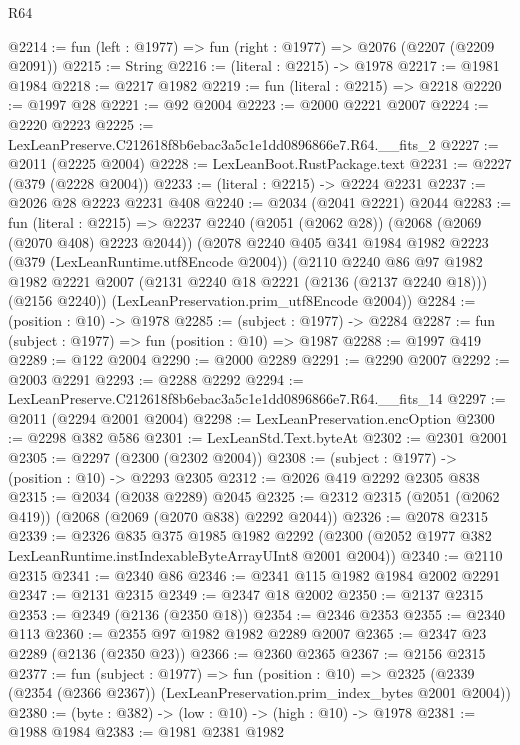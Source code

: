 \begin{lexlean}{R64}
\begin{coremodule}
@2214 := fun (left : @1977) => fun (right : @1977) => @2076 (@2207 (@2209 @2091))
@2215 := String
@2216 := (literal : @2215) -> @1978
@2217 := @1981 @1984
@2218 := @2217 @1982
@2219 := fun (literal : @2215) => @2218
@2220 := @1997 @28
@2221 := @92 @2004
@2223 := @2000 @2221 @2007
@2224 := @2220 @2223
@2225 := LexLeanPreserve.C212618f8b6ebac3a5c1e1dd0896866e7.R64.__fits_2
@2227 := @2011 (@2225 @2004)
@2228 := LexLeanBoot.RustPackage.text
@2231 := @2227 (@379 (@2228 @2004))
@2233 := (literal : @2215) -> @2224 @2231
@2237 := @2026 @28 @2223 @2231 @408
@2240 := @2034 (@2041 @2221) @2044
@2283 := fun (literal : @2215) =>
  @2237
    @2240
    (@2051 (@2062 @28))
    (@2068 (@2069 (@2070 @408) @2223 @2044))
    (@2078
      @2240
      @405
      @341
      @1984
      @1982
      @2223
      (@379 (LexLeanRuntime.utf8Encode @2004))
      (@2110
        @2240
        @86
        @97
        @1982
        @1982
        @2221
        @2007
        (@2131 @2240 @18 @2221 (@2136 (@2137 @2240 @18)))
        (@2156 @2240))
      (LexLeanPreservation.prim_utf8Encode @2004))
@2284 := (position : @10) -> @1978
@2285 := (subject : @1977) -> @2284
@2287 := fun (subject : @1977) => fun (position : @10) => @1987
@2288 := @1997 @419
@2289 := @122 @2004
@2290 := @2000 @2289
@2291 := @2290 @2007
@2292 := @2003 @2291
@2293 := @2288 @2292
@2294 := LexLeanPreserve.C212618f8b6ebac3a5c1e1dd0896866e7.R64.__fits_14
@2297 := @2011 (@2294 @2001 @2004)
@2298 := LexLeanPreservation.encOption
@2300 := @2298 @382 @586
@2301 := LexLeanStd.Text.byteAt
@2302 := @2301 @2001
@2305 := @2297 (@2300 (@2302 @2004))
@2308 := (subject : @1977) -> (position : @10) -> @2293 @2305
@2312 := @2026 @419 @2292 @2305 @838
@2315 := @2034 (@2038 @2289) @2045
@2325 := @2312 @2315 (@2051 (@2062 @419)) (@2068 (@2069 (@2070 @838) @2292 @2044))
@2326 := @2078 @2315
@2339 := @2326
    @835
    @375
    @1985
    @1982
    @2292
    (@2300 (@2052 @1977 @382 LexLeanRuntime.instIndexableByteArrayUInt8 @2001 @2004))
@2340 := @2110 @2315
@2341 := @2340 @86
@2346 := @2341 @115 @1982 @1984 @2002 @2291
@2347 := @2131 @2315
@2349 := @2347 @18 @2002
@2350 := @2137 @2315
@2353 := @2349 (@2136 (@2350 @18))
@2354 := @2346 @2353
@2355 := @2340 @113
@2360 := @2355 @97 @1982 @1982 @2289 @2007
@2365 := @2347 @23 @2289 (@2136 (@2350 @23))
@2366 := @2360 @2365
@2367 := @2156 @2315
@2377 := fun (subject : @1977) =>
  fun (position : @10) =>
  @2325 (@2339 (@2354 (@2366 @2367)) (LexLeanPreservation.prim_index_bytes @2001 @2004))
@2380 := (byte : @382) -> (low : @10) -> (high : @10) -> @1978
@2381 := @1988 @1984
@2383 := @1981 @2381 @1982

\end{coremodule}
\end{lexlean}
